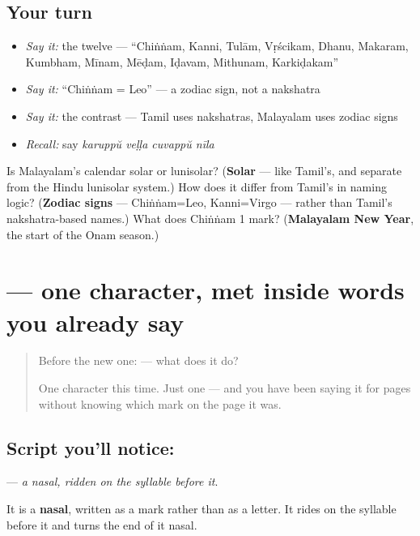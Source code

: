 \subsection*{Your turn}
\begin{itemize}
\raggedright
  \item \emph{Say it:} the twelve — \textquotedblleft{}Chiṅṅam, Kanni, Tulām, Vṛścikam, Dhanu, Makaram, Kumbham, Mīnam, Mēḍam, Iḍavam, Mithunam, Karkiḍakam\textquotedblright{}
  \item \emph{Say it:} \textquotedblleft{}Chiṅṅam = Leo\textquotedblright{} — a zodiac sign, not a nakshatra
  \item \emph{Say it:} the contrast — Tamil uses nakshatras, Malayalam uses zodiac signs
  \item \emph{Recall:} say \emph{karuppŭ veḷḷa cuvappŭ nīla}
\end{itemize}

\begin{tcolorbox}[breakable,colback=teal!4,colframe=teal!35!black,title={Before you move on}]
Is Malayalam's calendar solar or lunisolar? (\textbf{Solar} — like Tamil's, and separate from the Hindu lunisolar system.) How does it differ from Tamil's in naming logic? (\textbf{Zodiac signs} — Chiṅṅam=Leo, Kanni=Virgo — rather than Tamil's nakshatra-based names.) What does Chiṅṅam 1 mark? (\textbf{Malayalam New Year}, the start of the Onam season.)
\end{tcolorbox}
\section[\texorpdfstring{\ml{ം} (anusvara)}{ം (anusvara)}]{ — one character, met inside words you already say}

\label{lesson:ML-S120-sign-anusvara}



\begin{quote}
Before the new one:  — what does it do?

One character this time. Just one — and you have been saying it for pages without knowing which mark on the page it was.
\end{quote}

\subsection*{Script you'll notice: }
\textbf{} — \emph{a nasal, ridden on the syllable before it}.

It is a \textbf{nasal}, written as a mark rather than as a letter. It rides on the syllable before it and turns the end of it nasal.

